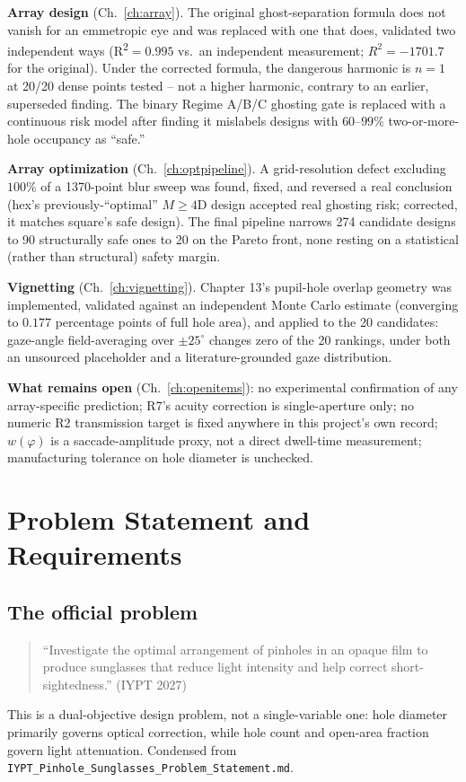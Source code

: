 \documentclass[11pt]{report}
\begin{document}
\textbf{Array design} (Ch.~\ref{ch:array}). The original ghost-separation formula does not
vanish for an emmetropic eye and was replaced with one that does, validated two independent
ways (R\textsuperscript{2}$=0.995$ vs.\ an independent measurement; $R^2=-1701.7$ for the
original). Under the corrected formula, the dangerous harmonic is $n{=}1$ at 20/20 dense
points tested -- not a higher harmonic, contrary to an earlier, superseded finding. The
binary Regime A/B/C ghosting gate is replaced with a continuous risk model after finding it
mislabels designs with $60$--$99\%$ two-or-more-hole occupancy as ``safe.''

\textbf{Array optimization} (Ch.~\ref{ch:optpipeline}). A grid-resolution defect excluding
$100\%$ of a 1370-point blur sweep was found, fixed, and reversed a real conclusion (hex's
previously-``optimal'' $M{\geq}4$D design accepted real ghosting risk; corrected, it matches
square's safe design). The final pipeline narrows 274 candidate designs to 90 structurally
safe ones to 20 on the Pareto front, none resting on a statistical (rather than structural)
safety margin.

\textbf{Vignetting} (Ch.~\ref{ch:vignetting}). Chapter 13's pupil-hole overlap geometry was
implemented, validated against an independent Monte Carlo estimate (converging to $0.177$
percentage points of full hole area), and applied to the 20 candidates: gaze-angle
field-averaging over $\pm25^\circ$ changes zero of the 20 rankings, under both an unsourced
placeholder and a literature-grounded gaze distribution.

\textbf{What remains open} (Ch.~\ref{ch:openitems}): no experimental confirmation of any
array-specific prediction; R7's acuity correction is single-aperture only; no numeric R2
transmission target is fixed anywhere in this project's own record; $w(\varphi)$ is a
saccade-amplitude proxy, not a direct dwell-time measurement; manufacturing tolerance on hole
diameter is unchecked.

\chapter{Problem Statement and Requirements}
\label{ch:problem}

\section{The official problem}
\begin{quote}
``Investigate the optimal arrangement of pinholes in an opaque film to produce sunglasses
that reduce light intensity and help correct short-sightedness.'' (IYPT 2027)
\end{quote}
This is a dual-objective design problem, not a single-variable one: hole diameter primarily
governs optical correction, while hole count and open-area fraction govern light
attenuation. Condensed from \texttt{IYPT\_Pinhole\_Sunglasses\_Problem\_Statement.md}.
\end{document}

